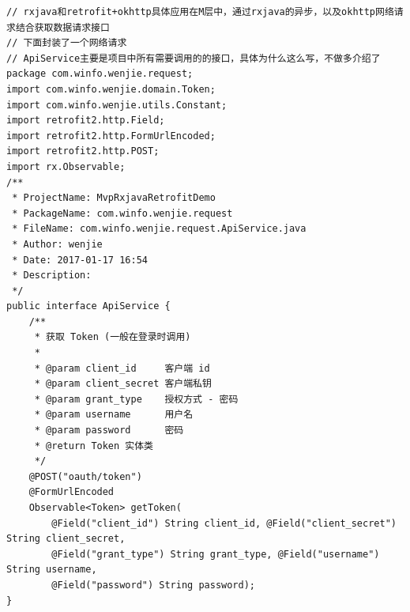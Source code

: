 \documentclass[9pt, b5paper]{article}
\begin{document}
\begin{verbatim}
// rxjava和retrofit+okhttp具体应用在M层中，通过rxjava的异步，以及okhttp网络请求结合获取数据请求接口
// 下面封装了一个网络请求
// ApiService主要是项目中所有需要调用的的接口，具体为什么这么写，不做多介绍了
package com.winfo.wenjie.request;
import com.winfo.wenjie.domain.Token;
import com.winfo.wenjie.utils.Constant;
import retrofit2.http.Field;
import retrofit2.http.FormUrlEncoded;
import retrofit2.http.POST;
import rx.Observable;
/**
 * ProjectName: MvpRxjavaRetrofitDemo
 * PackageName: com.winfo.wenjie.request
 * FileName: com.winfo.wenjie.request.ApiService.java
 * Author: wenjie
 * Date: 2017-01-17 16:54
 * Description:
 */
public interface ApiService {
    /**
     * 获取 Token (一般在登录时调用)
     *
     * @param client_id     客户端 id
     * @param client_secret 客户端私钥
     * @param grant_type    授权方式 - 密码
     * @param username      用户名
     * @param password      密码
     * @return Token 实体类
     */
    @POST("oauth/token")
    @FormUrlEncoded
    Observable<Token> getToken(
        @Field("client_id") String client_id, @Field("client_secret") String client_secret,
        @Field("grant_type") String grant_type, @Field("username") String username,
        @Field("password") String password);
}


\end{verbatim}
\end{document}
